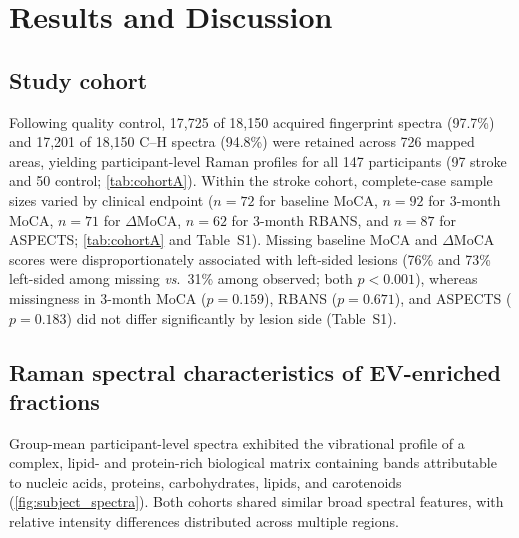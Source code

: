 \documentclass[preprint,12pt]{elsarticle}
\begin{document}
\section{Results and Discussion} 
\label{sec:results}

\subsection{Study cohort}

Following quality control, 17,725 of 18,150 acquired fingerprint spectra (97.7\%) and 17,201 of 18,150 C--H spectra (94.8\%) were retained across 726 mapped areas, yielding participant-level Raman profiles for all 147 participants (97 stroke and 50 control; \cref{tab:cohortA}). Within the stroke cohort, complete-case sample sizes varied by clinical endpoint ($n=72$ for baseline MoCA, $n=92$ for 3-month MoCA, $n=71$ for $\Delta$MoCA, $n=62$ for 3-month RBANS, and $n=87$ for ASPECTS; \cref{tab:cohortA} and Table~S1). Missing baseline MoCA and $\Delta$MoCA scores were disproportionately associated with left-sided lesions (76\% and 73\% left-sided among missing \textit{vs}.\ 31\% among observed; both $p<0.001$), whereas missingness in 3-month MoCA ($p=0.159$), RBANS ($p=0.671$), and ASPECTS ($p=0.183$) did not differ significantly by lesion side (Table~S1).


\subsection{Raman spectral characteristics of EV-enriched fractions}

Group-mean participant-level spectra exhibited the vibrational profile of a complex, lipid- and protein-rich biological matrix containing bands attributable to nucleic acids, proteins, carbohydrates, lipids, and carotenoids (\cref{fig:subject_spectra}). Both cohorts shared similar broad spectral features, with relative intensity differences distributed across multiple regions.
\end{document}
